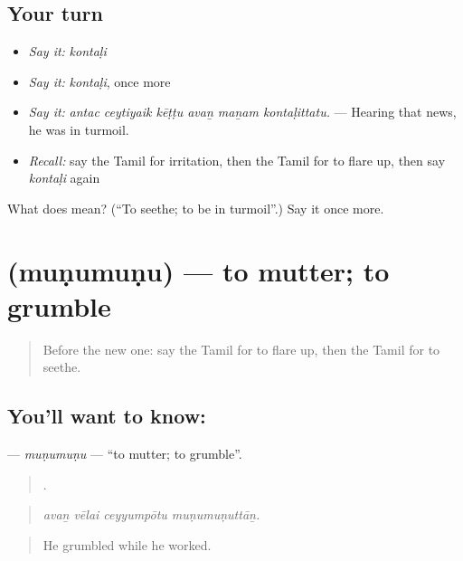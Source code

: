 \subsection*{Your turn}
\begin{itemize}
\raggedright
  \item \emph{Say it:} \emph{kontaḷi}
  \item \emph{Say it:} \emph{kontaḷi}, once more
  \item \emph{Say it:} \emph{antac ceytiyaik kēṭṭu avaṉ maṉam kontaḷittatu.} — Hearing that news, he was in turmoil.
  \item \emph{Recall:} say the Tamil for irritation, then the Tamil for to flare up, then say \emph{kontaḷi} again
\end{itemize}

\begin{tcolorbox}[breakable,colback=teal!4,colframe=teal!35!black,title={Before you move on}]
What does  mean? (\textquotedblleft{}To seethe; to be in turmoil\textquotedblright{}.) Say it once more.
\end{tcolorbox}
\section[\texorpdfstring{\ta{முணுமுணு} (muṇumuṇu)}{முணுமுணு (muṇumuṇu)}]{ (muṇumuṇu) — to mutter; to grumble}

\label{lesson:TA-C453-munumunu}



\begin{quote}
Before the new one: say the Tamil for to flare up, then the Tamil for to seethe.
\end{quote}

\subsection*{You'll want to know: }
\textbf{} — \emph{muṇumuṇu} — \textquotedblleft{}to mutter; to grumble\textquotedblright{}.

\begin{quote}
   .
\end{quote}

\begin{quote}
\emph{avaṉ vēlai ceyyumpōtu muṇumuṇuttāṉ.}
\end{quote}

\begin{quote}
He grumbled while he worked.
\end{quote}

